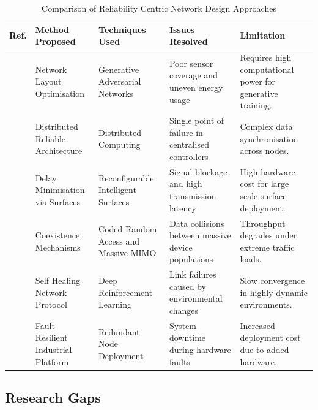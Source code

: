 \documentclass[a4paper,fleqn]{cas-dc}
\numberwithin{equation}{section}
\begin{document}
\begin{table}[width=.9\textwidth,cols=5,pos=h]
\caption{Comparison of Reliability Centric Network Design Approaches}
\label{tab:literature_summary}
\begin{tabular*}{\textwidth}{@{\extracolsep{\fill}} p{} p{} p{} p{} p{}}
\toprule
\textbf{Ref.} & \textbf{Method Proposed} & \textbf{Techniques Used} & \textbf{Issues Resolved} & \textbf{Limitation} \\
\midrule

\cite{b2} &
Network Layout Optimisation &
Generative Adversarial Networks &
Poor sensor coverage and uneven energy usage &
Requires high computational power for generative training. \\
\addlinespace

\cite{b3} &
Distributed Reliable Architecture &
Distributed Computing &
Single point of failure in centralised controllers &
Complex data synchronisation across nodes. \\
\addlinespace

\cite{b4} &
Delay Minimisation via Surfaces &
Reconfigurable Intelligent Surfaces &
Signal blockage and high transmission latency &
High hardware cost for large scale surface deployment. \\
\addlinespace

\cite{b5} &
Coexistence Mechanisms &
Coded Random Access and Massive MIMO &
Data collisions between massive device populations &
Throughput degrades under extreme traffic loads. \\
\addlinespace

\cite{Wang_2025_DRL_SelfHealing} &
Self Healing Network Protocol &
Deep Reinforcement Learning &
Link failures caused by environmental changes &
Slow convergence in highly dynamic environments. \\
\addlinespace

\cite{b7} &
Fault Resilient Industrial Platform &
Redundant Node Deployment &
System downtime during hardware faults &
Increased deployment cost due to added hardware. \\

\bottomrule
\end{tabular*}
\end{table}

\subsection{Research Gaps}
\end{document}

